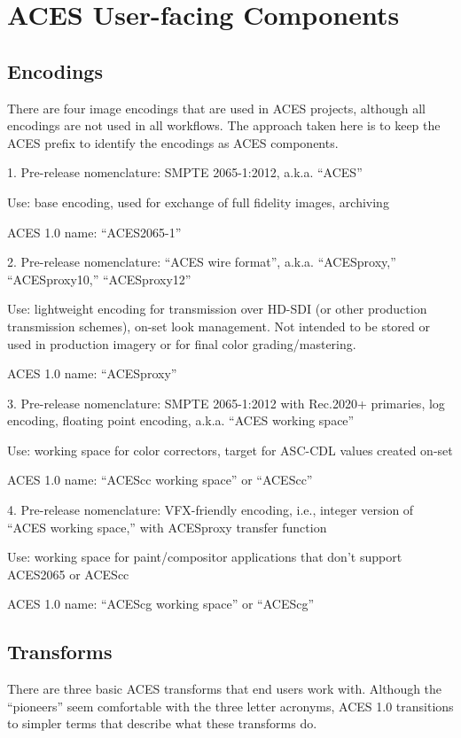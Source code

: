 \numberedformat
\chapter{ACES User-facing Components}

\section{Encodings}
There are four image encodings that are used in ACES projects, although all encodings are not used in all workflows. The approach taken here is to keep the ACES prefix to identify the encodings as ACES components.

1. Pre-release nomenclature: SMPTE 2065-1:2012, a.k.a. ``ACES''

Use: base encoding, used for exchange of full fidelity images, archiving

ACES 1.0 name: ``ACES2065-1''

\vspace{10pt}
2. Pre-release nomenclature: ``ACES wire format'', a.k.a. ``ACESproxy,'' ``ACESproxy10,'' ``ACESproxy12''

Use: lightweight encoding for transmission over HD-SDI (or other production transmission schemes), on-set look management. Not intended to be stored or used in production imagery or for final color grading/mastering.

ACES 1.0 name: ``ACESproxy'' 

\vspace{10pt}
3. Pre-release nomenclature: SMPTE 2065-1:2012 with Rec.2020+ primaries, log encoding, floating point encoding, a.k.a. ``ACES working space''

Use: working space for color correctors, target for ASC-CDL values created on-set 

ACES 1.0 name: ``ACEScc working space'' or ``ACEScc'' 

\vspace{10pt}
4. Pre-release nomenclature: VFX-friendly encoding, i.e., integer version of ``ACES working space,'' with ACESproxy transfer function

Use: working space for paint/compositor applications that don’t support ACES2065 or ACEScc

ACES 1.0 name: ``ACEScg working space'' or ``ACEScg''

\section{Transforms}
There are three basic ACES transforms that end users work with. Although the ``pioneers'' seem comfortable with the three letter acronyms, ACES 1.0 transitions to simpler terms that describe what these transforms do.

